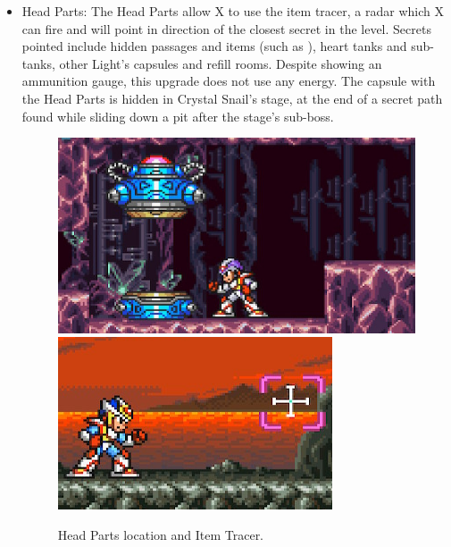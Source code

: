 \begin{itemize}
	\item Head Parts: The Head Parts allow X to use the item tracer, a radar which X can fire and will point in direction of the closest secret in the level. Secrets pointed include hidden passages and items (such as ), heart tanks and sub-tanks, other Light's capsules and refill rooms. Despite showing an ammunition gauge, this upgrade does not use any energy. The capsule with the Head Parts is hidden in Crystal Snail's stage, at the end of a secret path found while sliding down a pit after the stage's sub-boss.
	\begin{figure}[htp]
		\centering
		\includegraphics[width=0.4\linewidth]{figures/X2/Crystal_snail/Crystal_capsule.jpg}
		\includegraphics[width=0.345\linewidth]{figures/X2/weapons/Tracer.png}
		\caption{Head Parts location and Item Tracer.}
	\end{figure}


\end{itemize}
